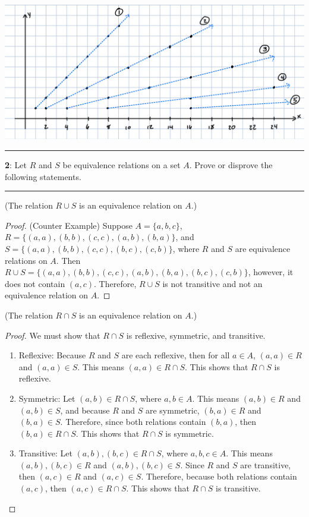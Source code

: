 \documentclass[11pt]{article}
\newcommand\question[2]{\vspace{.25in}\hrule\textbf{#1}: #2\vspace{.5em}\hrule\vspace{.10in}}
\renewcommand\part[1]{\vspace{.10in}(#1)\par}
\begin{document}
\includegraphics[width=1.0\textwidth]{images/1part2desc.png}
\pagebreak
\question{2}{Let $R$ and $S$ be equivalence relations on a set $A$. Prove or disprove the following statements.}

\part{The relation $R \cup S$ is an equivalence relation on $A$.}
\begin{proof}
	(Counter Example) Suppose $A = \{a, b, c\}$, $R=\{(a,a), (b,b), (c,c), (a,b), (b,a)\}$, and $S=\{(a,a),(b,b),(c,c),(b,c),(c,b)\}$, where $R$ and $S$ are equivalence relations on $A$. Then $R \cup S = \{(a,a),(b,b),(c,c),(a,b),(b,a),(b,c),(c,b)\}$, however, it does not contain $(a,c)$. Therefore, $R \cup S$ is not transitive and not an equivalence relation on $A$.
\end{proof}

\part{The relation $R \cap S$ is an equivalence relation on $A$.}
\begin{proof}
	We must show that $R \cap S$ is reflexive, symmetric, and transitive.
	\begin{enumerate}
		\item Reflexive: Because $R$ and $S$ are each reflexive, then for all $a \in A$, $(a,a) \in R$ and $(a,a) \in S$. This means $(a,a) \in R \cap S$. This shows that $R \cap S$ is reflexive.

		\item Symmetric: Let $(a,b) \in R \cap S$, where $a,b \in A$. This means $(a,b) \in R$ and $(a,b) \in S$, and because $R$ and $S$ are symmetric, $(b,a) \in R$ and $(b,a) \in S$. Therefore, since both relations contain $(b,a)$, then $(b,a) \in R \cap S$. This shows that $R \cap S$ is symmetric.

		\item Transitive: Let $(a,b),(b,c) \in R \cap S$, where $a,b,c \in A$. This means $(a,b),(b,c) \in R$ and $(a,b),(b,c) \in S$. Since $R$ and $S$ are transitive, then $(a,c) \in R$ and $(a,c) \in S$. Therefore, because both relations contain $(a,c)$, then $(a,c) \in R \cap S$. This shows that $R \cap S$ is transitive.
	\end{enumerate}
\end{proof}
\end{document}
